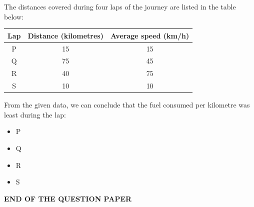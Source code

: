 \documentclass[journal,12pt,onecolumn]{IEEEtran}
\theoremstyle{remark}
\begin{document}
\begin{enumerate}
\begin{center}
\end{center}
 

The distances covered during four laps of the journey are listed in the table below:

 
\begin{center}
\begin{tabular}{|c|c|c|}
\hline
\textbf{Lap} & \textbf{Distance (kilometres)} & \textbf{Average speed (km/h)} \\
\hline
P & 15 & 15 \\
Q & 75 & 45 \\
R & 40 & 75 \\
S & 10 & 10 \\
\hline
\end{tabular}
\end{center}

 
From the given data, we can conclude that the fuel consumed per kilometre was least during the lap:

\begin{multicols}{2}
\begin{itemize}[label=(A)]
    \item P
    \item Q
    \item R
    \item S
\end{itemize}
\end{multicols}

 

\centerline{\textbf{END OF THE QUESTION PAPER}}


\end{enumerate}
\end{document}
